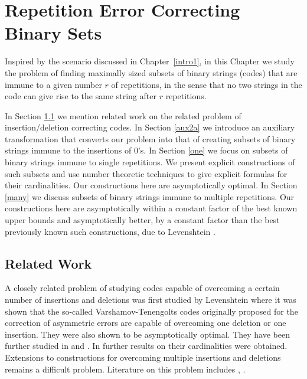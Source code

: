 \chapter[Repetition Error Correcting Binary Sets]{Repetition Error Correcting Binary
Sets}\label{numbertheory}



Inspired by the scenario discussed in Chapter~\ref{intro1}, in this
Chapter we study the problem of finding maximally sized subsets of
binary strings (codes) that are immune to a given number $r$ of
repetitions, in the sense that no two strings in the code can give
rise to the same string after $r$ repetitions.

In Section \ref{sectionrw} we mention related work on the related
problem of insertion/deletion correcting codes. In Section
\ref{aux2a} we introduce an auxiliary transformation that converts
our problem into that of creating subsets of binary strings immune
to the insertions of $0$'s.
 In Section \ref{one} we
focus on subsets of binary strings immune to single repetitions.
We present explicit constructions of such subsets and use number
theoretic techniques to give explicit formulas for their
cardinalities. Our constructions here are asymptotically optimal.
In Section \ref{many} we discuss subsets of binary strings immune
to multiple repetitions. Our constructions here are asymptotically
within a constant factor of the best known upper bounds and
asymptotically better, by a constant factor than the best
previously known such constructions, due to Levenshtein
\cite{lev:66a}.

\section{Related Work}\label{sectionrw}

A closely related problem of studying codes capable of overcoming
a certain number of insertions and deletions was first studied by
Levenshtein \cite{lev:66} where it was shown that the so-called
Varshamov-Tenengolts codes \cite{vt:65} originally proposed for
the correction of asymmetric errors are capable of overcoming one
deletion or one insertion. They were also shown to be
asymptotically optimal. They have been further studied in
\cite{ferr:97} and \cite{bours:94}. In \cite{sloane:00} further
results on their cardinalities were obtained. Extensions to
constructions for overcoming multiple insertions and deletions
remains a difficult problem. Literature on this problem includes
\cite{ferr:02}, \cite{ferr:03}.

